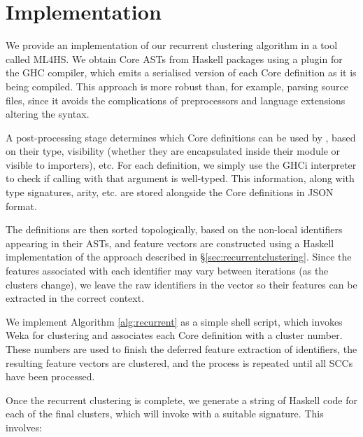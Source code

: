 \section{Implementation}
\label{sec:implementation}

We provide an implementation of our recurrent clustering algorithm in a tool called \textsc{ML4HS}. We obtain Core ASTs from Haskell packages using a plugin for the GHC compiler, which emits a serialised version of each Core definition as it is being compiled. This approach is more robust than, for example, parsing source files, since it avoids the complications of preprocessors and language extensions altering the syntax.

A post-processing stage determines which Core definitions can be used by \qspec{}, based on their type, visibility (whether they are encapsulated inside their module or visible to importers), etc. For each definition, we simply use the GHCi interpreter to check if calling \qspec{} with that argument is well-typed. This information, along with type signatures, arity, etc. are stored alongside the Core definitions in JSON format.

The definitions are then sorted topologically, based on the non-local identifiers appearing in their ASTs, and feature vectors are constructed using a Haskell implementation of the approach described in \S \ref{sec:recurrentclustering}. Since the features associated with each identifier may vary between iterations (as the clusters change), we leave the raw identifiers in the vector so their features can be extracted in the correct context.

We implement Algorithm \ref{alg:recurrent} as a simple shell script, which invokes Weka for clustering and associates each Core definition with a cluster number. These numbers are used to finish the deferred feature extraction of identifiers, the resulting feature vectors are clustered, and the process is repeated until all SCCs have been processed.

Once the recurrent clustering is complete, we generate a string of Haskell code for each of the final clusters, which will invoke \qspec{} with a suitable signature. This involves:

